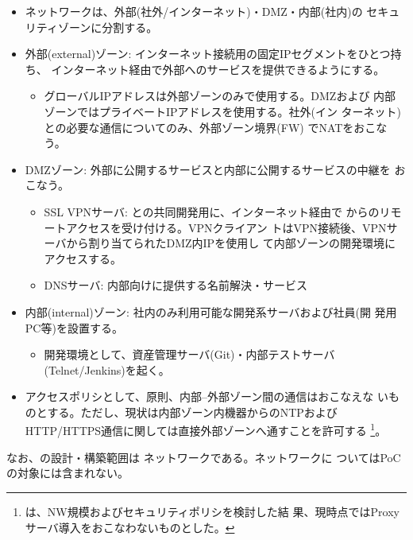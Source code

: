 \begin{itemize}
 \item \yo ネットワークは、外部(社外/インターネット)・DMZ・内部(社内)の
       セキュリティゾーンに分割する。
 \item 外部(external)ゾーン: インターネット接続用の固定IPセグメントをひとつ持ち、
       インターネット経由で外部へのサービスを提供できるようにする。
       \begin{itemize}
        \item グローバルIPアドレスは外部ゾーンのみで使用する。DMZおよび
              内部ゾーンではプライベートIPアドレスを使用する。社外(イン
              ターネット)との必要な通信についてのみ、外部ゾーン境界(FW)
              でNATをおこなう。
       \end{itemize}
 \item DMZゾーン: 外部に公開するサービスと内部に公開するサービスの中継を
       おこなう。
       \begin{itemize}
        \item SSL VPNサーバ: \tj との共同開発用に、インターネット経由で
              \tj からのリモートアクセスを受け付ける。\tj VPNクライアン
              トはVPN接続後、VPNサーバから割り当てられたDMZ内IPを使用し
              て内部ゾーンの開発環境にアクセスする。
        \item DNSサーバ: \yo 内部向けに提供する名前解決・サービス
       \end{itemize}
 \item 内部(internal)ゾーン: 社内のみ利用可能な開発系サーバおよび社員(開
       発用PC等)を設置する。
       \begin{itemize}
        \item 開発環境として、資産管理サーバ(Git)・内部テストサーバ
              (Telnet/Jenkins)を起く。
       \end{itemize}
 \item アクセスポリシとして、原則、内部--外部ゾーン間の通信はおこなえな
       いものとする。ただし、現状は内部ゾーン内機器からのNTPおよび
       HTTP/HTTPS通信に関しては直接外部ゾーンへ通すことを許可する
       \footnote{\tj は、\yo NW規模およびセキュリティポリシを検討した結
       果、現時点ではProxyサーバ導入をおこなわないものとした。}。
\end{itemize}

なお、\tj の設計・構築範囲は \yo ネットワークである。\tj ネットワークに
ついてはPoCの対象には含まれない。


